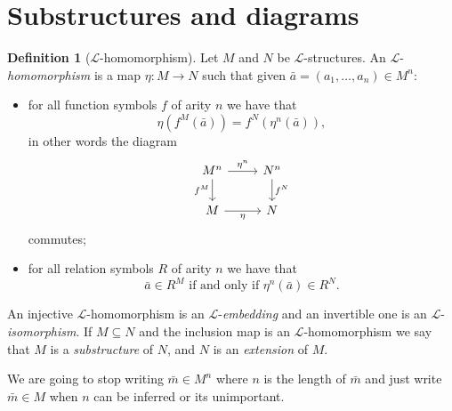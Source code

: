 \documentclass{report}
\theoremstyle{definition}
\theoremstyle{plain}
\theoremstyle{definition}
\newtheorem{defn}[thm]{Definition}
\begin{document}
	\section{Substructures and diagrams}
	\begin{defn}[$\mathcal{L}$-homomorphism]
		Let $M$ and $N$ be $\mathcal{L}$-structures. An $\mathcal{L}$-\emph{homomorphism} is a map $\eta\colon M \to N$ such that given $\bar{a} = (a_1,\ldots,a_n)\in M^n$:
		\begin{itemize}
			\item for all function symbols $f$ of arity $n$ we have that 
			\[
				\eta(f^{M}(\bar{a})) = f^N(\eta^n(\bar{a})),
			\]
			in other words the diagram
			\[\begin{tikzcd}
				{M^n} & {N^n} \\
				M & N
				\arrow["\eta"', from=2-1, to=2-2]
				\arrow["{f^M}"', from=1-1, to=2-1]
				\arrow["{f^N}", from=1-2, to=2-2]
				\arrow["{\eta^n}", from=1-1, to=1-2]
			\end{tikzcd}\]
			commutes;
			\item for all relation symbols $R$ of arity $n$ we have that
			\[
				\bar{a}\in R^M \text{ if and only if }\eta^n(\bar{a})\in  R^N.
			\]
		\end{itemize}
		An injective $\mathcal{L}$-homomorphism is an $\mathcal{L}$-\emph{embedding} and an invertible one is an $\mathcal{L}$-\emph{isomorphism}. If $M\subseteq N$ and the inclusion map is an $\mathcal{L}$-homomorphism we say that $M$ is a \emph{substructure} of $N$, and $N$ is an \emph{extension} of $M$.
	\end{defn}
	We are going to stop writing $\bar{m}\in M^n$ where $n$ is the length of $\bar{m}$ and just write $\bar{m}\in M$ when $n$ can be inferred or its unimportant.
\end{document}
